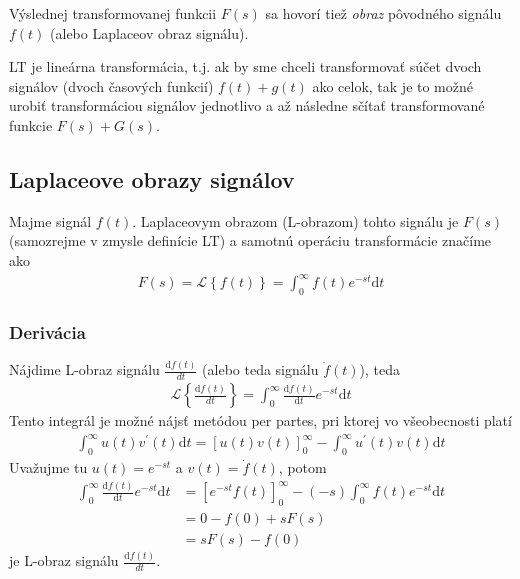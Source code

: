 \documentclass[a4paper, 10pt, ]{article}
\begin{document}
Výslednej transformovanej funkcii $F(s)$ sa hovorí tiež \emph{obraz} pôvodného signálu $f(t)$ (alebo Laplaceov obraz signálu).

LT je lineárna transformácia, t.j. ak by sme chceli transformovať súčet dvoch signálov (dvoch časových funkcií) $f(t) + g(t)$ ako celok, tak je to možné urobiť transformáciou signálov jednotlivo a až následne sčítať transformované funkcie $F(s) + G(s)$.

\subsection{Laplaceove obrazy signálov}

Majme signál $f(t)$. Laplaceovym obrazom (L-obrazom) tohto signálu je $F(s)$ (samozrejme v zmysle definície LT) a samotnú operáciu transformácie značíme ako
\begin{align}
    F(s)  =  \mathcal L \left\{ f(t) \right\} = \int_0^\infty f(t) e^{-st}\text{d}t
\end{align}




\subsubsection{Derivácia}

Nájdime L-obraz signálu $\frac{\text{d}f(t)}{dt}$ (alebo teda signálu $\dot f(t)$), teda
\begin{align}
    \mathcal L \left\{ \frac{\text{d}f(t)}{dt} \right\} = \int_0^\infty \frac{\text{d}f(t)}{\text{d}t} e^{-st}\text{d}t
\end{align}
Tento integrál je možné nájsť metódou per partes, pri ktorej vo všeobecnosti platí
\begin{align}
    \int_0^\infty u(t)v^\prime(t)\text{d}t = \left[ u(t)v(t) \right]_0^\infty - \int_0^\infty u^\prime(t) v(t) \text{d}t
\end{align}
Uvažujme tu $u(t) = e^{-st}$ a $v(t) = \dot f(t)$, potom
\begin{equation}
    \begin{aligned}
        \int_0^\infty \frac{\text{d}f(t)}{\text{d}t} e^{-st}\text{d}t
            &=  \left[ e^{-st} f(t) \right]_0^\infty - (-s)  \int_0^\infty f(t) e^{-st}\text{d}t \\
            &= 0 - f(0) + s F(s) \\
            &= s F(s) - f(0)
    \end{aligned}
\end{equation}
je L-obraz signálu $\frac{\text{d}f(t)}{dt}$.
\end{document}
